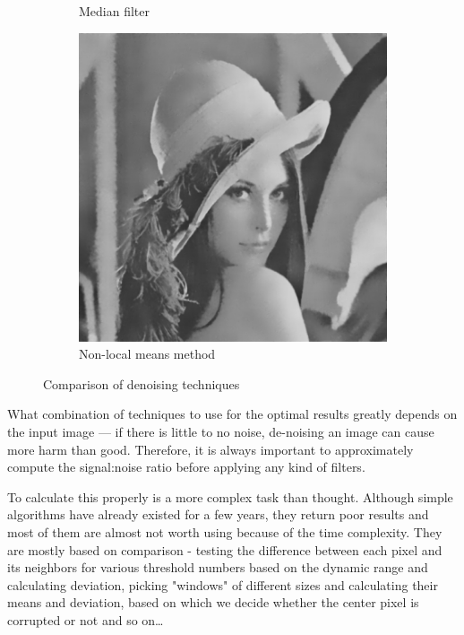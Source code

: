 \begin{figure}[H]
\begin{subfigure}{0.31\textwidth}
\caption{Median filter} \label{fig:1b}
\end{subfigure}
\hspace*{\fill} %
\begin{subfigure}{0.31\textwidth}
\includegraphics[width=\linewidth]{img/denoise_nonlocal.png}
\caption{Non-local means method} \label{fig:1c}
\end{subfigure}
\caption{Comparison of denoising techniques} \label{fig:1}
\end{figure}

What combination of techniques to use for the optimal results greatly depends on the input image --- if there is little to no noise, de-noising an image can cause more harm than good. Therefore, it is always important to approximately compute the signal:noise ratio before applying any kind of filters.


To calculate this properly is a more complex task than thought. Although simple algorithms have already existed for a few years, they return poor results and most of them are almost not worth using because of the time complexity. They are mostly based on comparison - testing the difference between each pixel and its neighbors for various threshold numbers based on the dynamic range and calculating deviation, picking "windows" of different sizes and calculating their means and deviation, based on which we decide whether the center pixel is corrupted or not and so on\ldots

